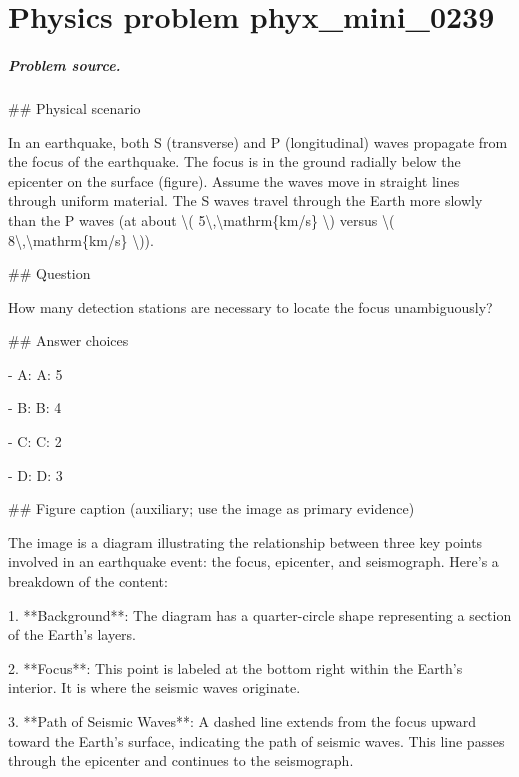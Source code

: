 
\chapter{Physics problem phyx\_mini\_0239}
\label{ch:PhyXMiniProblems_problem_phyx_mini_0239}

\paragraph{Problem source.}
\#\# Physical scenario

In an earthquake, both S (transverse) and P (longitudinal) waves propagate from the focus of the earthquake. The focus is in the ground radially below the epicenter on the surface (figure). Assume the waves move in straight lines through uniform material. The S waves travel through the Earth more slowly than the P waves (at about \textbackslash{}( 5\textbackslash{},\textbackslash{}mathrm\{km/s\} \textbackslash{}) versus \textbackslash{}( 8\textbackslash{},\textbackslash{}mathrm\{km/s\} \textbackslash{})).

\#\# Question

How many detection stations are necessary to locate the focus unambiguously?

\#\# Answer choices

- A: A: 5

- B: B: 4

- C: C: 2

- D: D: 3

\#\# Figure caption (auxiliary; use the image as primary evidence)

The image is a diagram illustrating the relationship between three key points involved in an earthquake event: the focus, epicenter, and seismograph. Here's a breakdown of the content:

1. **Background**: The diagram has a quarter-circle shape representing a section of the Earth's layers.
   
2. **Focus**: This point is labeled at the bottom right within the Earth's interior. It is where the seismic waves originate.

3. **Path of Seismic Waves**: A dashed line extends from the focus upward toward the Earth's surface, indicating the path of seismic waves. This line passes through the epicenter and continues to the seismograph.

